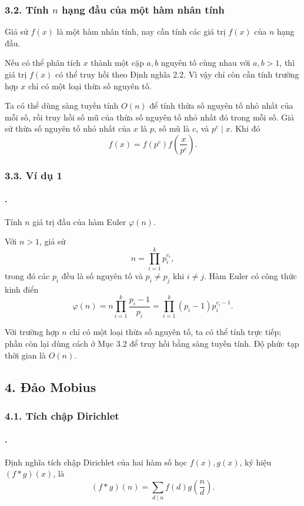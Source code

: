 \documentclass[11pt]{article}
\begin{document}
\subsubsection*{3.2. Tính \(n\) hạng đầu của một hàm nhân tính}

Giả sử \(f(x)\) là một hàm nhân tính, nay cần tính các giá trị \(f(x)\) của
\(n\) hạng đầu.

Nếu có thể phân tích \(x\) thành một cặp \(a,b\) nguyên tố cùng nhau với
\(a,b>1\), thì giá trị \(f(x)\) có thể truy hồi theo Định nghĩa 2.2. Vì vậy
chỉ còn cần tính trường hợp \(x\) chỉ có một loại thừa số nguyên tố.

Ta có thể dùng sàng tuyến tính \(O(n)\) để tính thừa số nguyên tố nhỏ nhất của
mỗi số, rồi truy hồi số mũ của thừa số nguyên tố nhỏ nhất đó trong mỗi số.
Giả sử thừa số nguyên tố nhỏ nhất của \(x\) là \(p\), số mũ là \(c\), và
\(p^c\mid x\). Khi đó
\[
  f(x)=f(p^c)f\left(\frac{x}{p^c}\right).
\]

\subsubsection*{3.3. Ví dụ 1}

\paragraph{.}
Tính \(n\) giá trị đầu của hàm Euler \(\varphi(n)\).

Với \(n>1\), giả sử
\[
  n=\prod_{i=1}^{k} p_i^{c_i},
\]
trong đó các \(p_i\) đều là số nguyên tố và \(p_i\ne p_j\) khi \(i\ne j\).
Hàm Euler có công thức kinh điển
\[
  \varphi(n)
  = n\prod_{i=1}^{k}\frac{p_i-1}{p_i}
  = \prod_{i=1}^{k} (p_i-1)p_i^{c_i-1}.
\]

Với trường hợp \(n\) chỉ có một loại thừa số nguyên tố, ta có thể tính trực
tiếp; phần còn lại dùng cách ở Mục 3.2 để truy hồi bằng sàng tuyến tính. Độ
phức tạp thời gian là \(O(n)\).

\subsection*{4. Đảo Mobius}

\subsubsection*{4.1. Tích chập Dirichlet}

\paragraph{.}
Định nghĩa tích chập Dirichlet của hai hàm số học \(f(x),g(x)\), ký hiệu
\((f*g)(x)\), là
\[
  (f*g)(n)=\sum_{d\mid n} f(d)g\left(\frac{n}{d}\right).
\]
\end{document}
